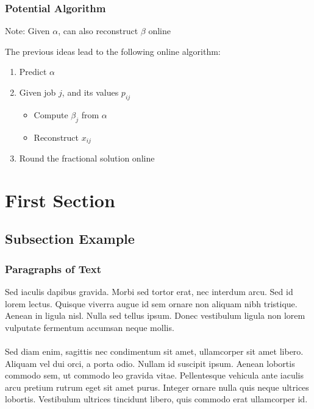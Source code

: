 \documentclass{beamer}
\begin{document}
\begin{frame}
\frametitle{Potential Algorithm}

Note: Given $\alpha$, can also reconstruct $\beta$ online

\vspace{0.5cm}

The previous ideas lead to the following online algorithm:

\begin{enumerate}
\item Predict $\alpha$
\item Given job $j$, and its values $p_{ij}$
\begin{itemize}
\item Compute $\beta_j$ from $\alpha$
\item Reconstruct $x_{ij}$
\end{itemize}
\item Round the fractional solution online
\end{enumerate}
\end{frame}




\iffalse

\section{First Section} %

\subsection{Subsection Example} %

\begin{frame}
\frametitle{Paragraphs of Text}
Sed iaculis dapibus gravida. Morbi sed tortor erat, nec interdum arcu. Sed id lorem lectus. Quisque viverra augue id sem ornare non aliquam nibh tristique. Aenean in ligula nisl. Nulla sed tellus ipsum. Donec vestibulum ligula non lorem vulputate fermentum accumsan neque mollis.\\~\\

Sed diam enim, sagittis nec condimentum sit amet, ullamcorper sit amet libero. Aliquam vel dui orci, a porta odio. Nullam id suscipit ipsum. Aenean lobortis commodo sem, ut commodo leo gravida vitae. Pellentesque vehicula ante iaculis arcu pretium rutrum eget sit amet purus. Integer ornare nulla quis neque ultrices lobortis. Vestibulum ultrices tincidunt libero, quis commodo erat ullamcorper id.
\end{frame}
\end{document}
